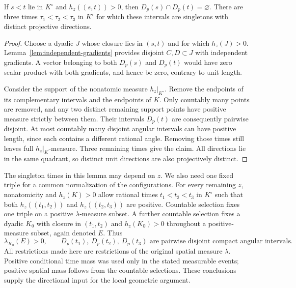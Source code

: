 \begin{lemma}\label{lem:separated-tangent-directions}
If $s<t$ lie in $K^\circ$ and $h_z((s,t))>0$, then
$D_p(s)\cap D_p(t)=\varnothing$.  There are three times
$\tau_1<\tau_2<\tau_3$ in $K^\circ$ for which these intervals are
singletons with distinct projective directions.
\end{lemma}

\begin{proof}
Choose a dyadic $J$ whose closure lies in $(s,t)$ and for which
$h_z(J)>0$.  Lemma~\ref{lem:independent-gradients} provides disjoint
$C,D\subset J$ with independent gradients.  A vector belonging to both
$D_p(s)$ and $D_p(t)$ would have zero scalar product with both gradients,
and hence be zero, contrary to unit length.

Consider the support of the nonatomic measure $h_z|_{K^\circ}$.
Remove the endpoints of its complementary intervals and the endpoints
of $K$.  Only countably many points are removed, and any two distinct
remaining support points have positive measure strictly between them.
Their intervals $D_p(t)$ are consequently pairwise disjoint.  At most
countably many disjoint angular intervals can have positive length, since
each contains a different rational angle.  Removing those times still
leaves full $h_z|_K$-measure.  Three remaining times give the claim.
All directions lie in the same quadrant, so distinct unit directions
are also projectively distinct.
\end{proof}

The singleton times in this lemma may depend on $z$.  We also need one
fixed triple for a common normalization of the configurations.  For
every remaining $z$, nonatomicity and $h_z(K)>0$ allow rational times
$t_1<t_2<t_3$ in $K^\circ$ such that both
$h_z((t_1,t_2))$ and $h_z((t_2,t_3))$ are positive.  Countable selection
fixes one triple on a positive $\lambda$-measure subset.  A further
countable selection fixes a dyadic $K_0$ with closure in $(t_1,t_2)$ and
$h_z(K_0)>0$ throughout a positive-measure subset, again denoted $E$.
Thus
\[
 \lambda_{K_0}(E)>0,
 \qquad
 D_p(t_1),\ D_p(t_2),\ D_p(t_3)
 \text{ are pairwise disjoint compact angular intervals.}
\]
All restrictions made here are restrictions of the original spatial
measure $\lambda$.  Positive conditional time mass was used only in
the stated measurable events; positive spatial mass follows from the
countable selections.  These conclusions supply the directional input
for the local geometric argument.
